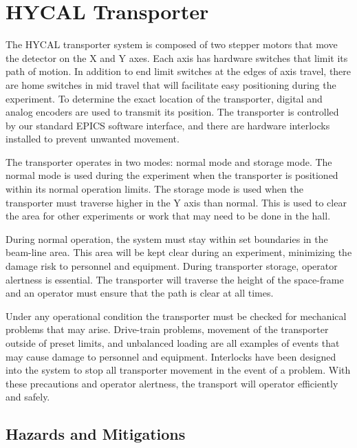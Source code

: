 \section{HYCAL Transporter}

The HYCAL transporter system is composed of two stepper motors that
move the detector on the X and Y axes. Each axis has hardware switches that
limit its path of motion. In addition to end limit switches at the edges of axis
travel, there are home switches in mid travel that will facilitate easy positioning
during the experiment. To determine the exact location of the transporter,
digital and analog encoders are used to transmit its position. The transporter
is controlled by our standard EPICS software interface, and there are hardware
interlocks installed to prevent unwanted movement.

The transporter operates in two modes: normal mode and storage mode.
The normal mode is used during the experiment when the transporter is positioned within 
its normal operation limits. The storage mode is used when the
transporter must traverse higher in the Y axis than normal. This is used to
clear the area for other experiments or work that may need to be done in the hall.

During normal operation, the system must stay within set boundaries in the
beam-line area. This area will be kept clear during an experiment, minimizing the damage 
risk to personnel and equipment. During transporter storage,
operator alertness is essential. The transporter will traverse the height of the
space-frame and an operator must ensure that the path is clear at all times.

Under any operational condition the transporter must be checked for mechanical problems that 
may arise. Drive-train problems, movement of the transporter outside of preset limits, and 
unbalanced loading are all examples of events
that may cause damage to personnel and equipment. Interlocks have been designed into the system 
to stop all transporter movement in the event of a problem. With these precautions and operator 
alertness, the transport will operator efficiently and safely.

\subsection{Hazards and Mitigations}

